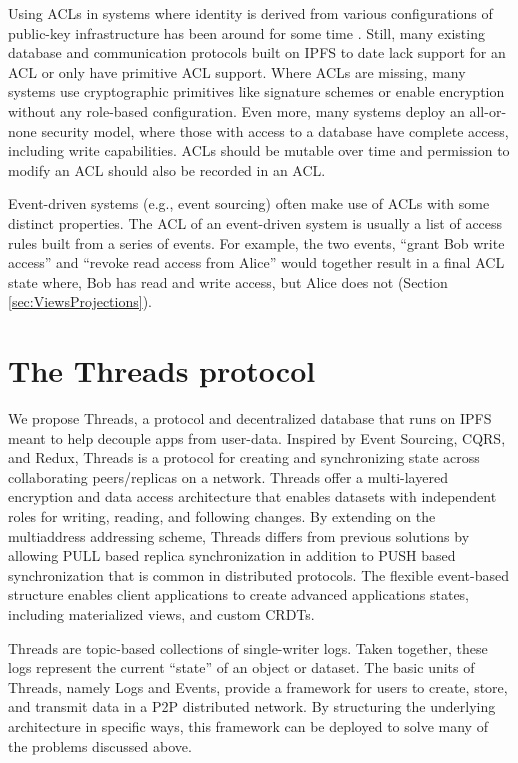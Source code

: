 \documentclass{textile}
\begin{document}
Using ACLs in systems where identity is derived from various configurations of public-key infrastructure has been around for some time \cite{herzbergAccessControlMeets2000}. Still, many existing database and communication protocols built on IPFS to date lack support for an ACL or only have primitive ACL support. Where ACLs are missing, many systems use cryptographic primitives like signature schemes or enable encryption without any role-based configuration. Even more, many systems deploy an all-or-none security model, where those with access to a database have complete access, including write capabilities. ACLs should be mutable over time and permission to modify an ACL should also be recorded in an ACL.

Event-driven systems (e.g., event sourcing) often make use of ACLs with some distinct properties. The ACL of an event-driven system is usually a list of access rules built from a series of events. For example, the two events, ``grant Bob write access'' and ``revoke read access from Alice'' would together result in a final ACL state where, Bob has read and write access, but Alice does not (Section  \ref{sec:ViewsProjections}).

\section{The Threads protocol}\label{sec:ThreadsProtocol}

We propose Threads, a protocol and decentralized database that runs on IPFS meant to help decouple apps from user-data. Inspired by Event Sourcing, CQRS, and Redux, Threads is a protocol for creating and synchronizing state across collaborating peers/replicas on a network. Threads offer a multi-layered encryption and data access architecture that enables datasets with independent roles for writing, reading, and following changes. By extending on the multiaddress addressing scheme, Threads differs from previous solutions by allowing PULL based replica synchronization in addition to PUSH based synchronization that is common in distributed protocols. The flexible event-based structure enables client applications to create advanced applications states, including materialized views, and custom CRDTs.

Threads are topic-based collections of single-writer logs. Taken together, these logs represent the current ``state'' of an object or dataset. The basic units of Threads, namely Logs and Events, provide a framework for users to create, store, and transmit data in a P2P distributed network. By structuring the underlying architecture in specific ways, this framework can be deployed to solve many of the problems discussed above.
\end{document}
